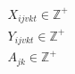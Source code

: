 \begin{align}
	 & X_{ijvkt} \in \mathbb{Z}^+                                                                                                                             \label{eq: m1_dom_assig}                                                                                                         \\
	 & Y_{ijvkt} \in \mathbb{Z}^+                                                                                                                             \label{eq: m1_dom_autho}                                                                                                         \\
	 & A_{jk} \in \mathbb{Z}^+                                                                                                                                \label{eq: m1_dom_disponi}
\end{align}


